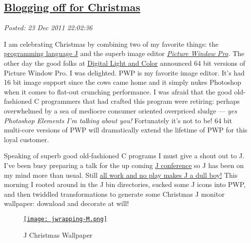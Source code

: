 %

\subsection*{\href{http://bakerjd99.wordpress.com/2011/12/23/blogging-off-for-christmas/}{Blogging off for Christmas}}


\noindent\emph{Posted: 23 Dec 2011 22:02:36}
\vspace{6pt}



I am celebrating Christmas by combining two of my favorite things: the
\href{http://www.jsoftware.com/}{programming language J} and the superb
image editor \emph{\href{http://www.dl-c.com/}{Picture Window Pro}.} The
other day the good folks at \href{http://www.dl-c.com/}{Digital Light
and Color} announced 64 bit versions of Picture Window Pro. I was
delighted. PWP is my favorite image editor. It's had 16 bit image
support since the cows came home and it simply nukes Photoshop when it
comes to flat-out crunching performance. I was afraid that the good
old-fashioned C programmers that had crafted this program were retiring:
perhaps overwhelmed by a sea of mediocre consumer oriented overpriced
sludge --- \emph{yes Photoshop Elements I'm talking about
you!} Fortunately it's not to be! 64 bit multi-core versions of PWP will
dramatically extend the lifetime of PWP for this loyal customer.

Speaking of superb good old-fashioned C programs I must give a shout out
to J. I've been busy preparing a talk for the up coming
\href{http://www.jsoftware.com/jwiki/Community/Conference2012}{J
conference} so J has been on my mind more than usual. Still
\href{http://www.youtube.com/watch?v=NgMdz2fe0CY}{all work and no play
makes J a dull boy!} This morning I rooted around in the J bin
directories, sucked some J icons into PWP, and then twiddled
transformations to generate some Christmas J monitor wallpaper: download
and decorate at will!


\captionsetup[figure]{labelformat=empty}
\begin{figure}[htbp]
\centering
\href{http://conceptcontrol.smugmug.com/Themes/Manipulations/Image-Hacking-1/7387395\_SCSNdg}{\texttt{[image: jwrapping-M.png]}}
\caption{J  Christmas  Wallpaper}
\label{fig:2315X0}
\end{figure}




%